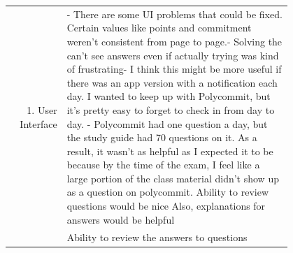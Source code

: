 \begin{longtable}{r|p{0.8\linewidth}}
	
	\label{feedback-table}
		1. User Interface& - There are some UI problems that could be fixed. Certain values like points and commitment weren't consistent from page to page.\newline-   Solving the can't see answers even if actually trying was kind of frustrating\newline-   I think this might be more useful if there was an app version with a notification each day. I wanted to keep up with Polycommit, but it's pretty easy to forget to check in from day to day. \newline-   Polycommit had one question a day, but the study guide had 70 questions on it. As a result, it wasn't as helpful as I expected it to be because by the time of the exam, I feel like a large portion of the class material didn't show up as a question on polycommit. \newline Ability to review questions would be nice Also, explanations for answers would be helpful                                                                                                                                                                                                                                                                                                                                                                                                                                                                                                                                                                                                          \\
		& Ability to review the answers to questions                                                                                                                                                                                                                                                                                                                                                                                                                                                                                                                                                                                                                                                                                                       \\

\end{longtable}
